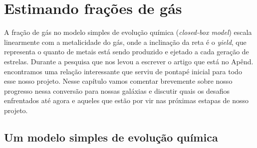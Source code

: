 



\chapter{Estimando frações de gás}
\label{sec:gasfrac}

A fração de gás no modelo simples de evolução química ({\em closed-box model}) escala linearmente
com a metalicidade do gás, onde a inclinação da reta é o {\em yield}, que representa o quanto de
metais está sendo produzido e ejetado a cada geração de estrelas. Durante a pesquisa que nos levou a
escrever o artigo que está no Apênd. \label{apendice:GDetal2014b} encontramos uma relação
interessante que serviu de pontapé inicial para todo esse nosso projeto. Nesse capítulo vamos
comentar brevemente sobre nosso progresso nessa conversão para nossas galáxias e discutir quais os
desafios enfrentados até agora e aqueles que estão por vir nas próximas estapas de nosso projeto.

\section{Um modelo simples de evolução química}
\label{sec:gasfrac:closedbox}

